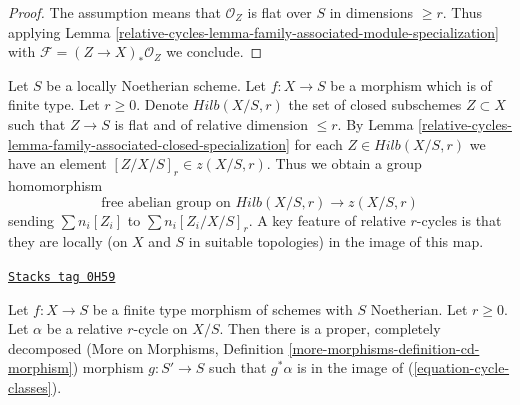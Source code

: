 \begin{proof}
The assumption means that $\mathcal{O}_Z$ is flat over $S$ in
dimensions $\geq r$. Thus applying
Lemma \ref{relative-cycles-lemma-family-associated-module-specialization}
with $\mathcal{F} = (Z \to X)_*\mathcal{O}_Z$ we conclude.
\end{proof}

Let $S$ be a locally Noetherian scheme. Let $f : X \to S$ be a morphism
which is of finite type. Let $r \geq 0$. Denote $Hilb(X/S, r)$
the set of closed subschemes $Z \subset X$ such that $Z \to S$ is flat
and of relative dimension $\leq r$. By
Lemma \ref{relative-cycles-lemma-family-associated-closed-specialization} for each
$Z \in Hilb(X/S, r)$ we have an element $[Z/X/S]_r \in z(X/S, r)$.
Thus we obtain a group homomorphism
\begin{equation}
\label{equation-cycle-classes}
\text{free abelian group on }Hilb(X/S, r) \longrightarrow z(X/S, r)
\end{equation}
sending $\sum n_i[Z_i]$ to $\sum n_i[Z_i/X/S]_r$.
A key feature of relative $r$-cycles is that they are locally
(on $X$ and $S$ in suitable topologies) in the image of this map.

\begin{lemma}
\label{relative-cycles-lemma-get-cycles}
\href{https://stacks.math.columbia.edu/tag/0H59}{\texttt{Stacks tag 0H59}}

Let $f : X \to S$ be a finite type morphism of schemes with $S$ Noetherian.
Let $r \geq 0$. Let $\alpha$ be a relative $r$-cycle on $X/S$. Then there is
a proper, completely decomposed
(More on Morphisms, Definition \ref{more-morphisms-definition-cd-morphism})
morphism $g : S' \to S$ such that $g^*\alpha$ is in the image of
(\ref{equation-cycle-classes}).
\end{lemma}


